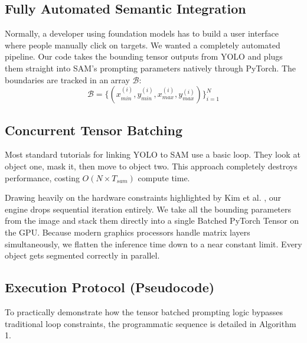 \documentclass[10pt, conference]{IEEEtran}
\begin{document}
\subsection{Fully Automated Semantic Integration}
Normally, a developer using foundation models has to build a user interface where people manually click on targets. We wanted a completely automated pipeline. Our code takes the bounding tensor outputs from YOLO and plugs them straight into SAM's prompting parameters natively through PyTorch. The boundaries are tracked in an array $\mathcal{B}$:
\begin{equation}
\mathcal{B} = \{ (x_{min}^{(i)}, y_{min}^{(i)}, x_{max}^{(i)}, y_{max}^{(i)}) \}_{i=1}^N
\end{equation}

\subsection{Concurrent Tensor Batching}
Most standard tutorials for linking YOLO to SAM use a basic loop. They look at object one, mask it, then move to object two. This approach completely destroys performance, costing $O(N \times T_{sam})$ compute time. 

Drawing heavily on the hardware constraints highlighted by Kim et al. \cite{b2}, our engine drops sequential iteration entirely. We take all the bounding parameters from the image and stack them directly into a single Batched PyTorch Tensor on the GPU. Because modern graphics processors handle matrix layers simultaneously, we flatten the inference time down to a near constant limit. Every object gets segmented correctly in parallel.

\subsection{Execution Protocol (Pseudocode)}
To practically demonstrate how the tensor batched prompting logic bypasses traditional loop constraints, the programmatic sequence is detailed in Algorithm 1.
\end{document}
